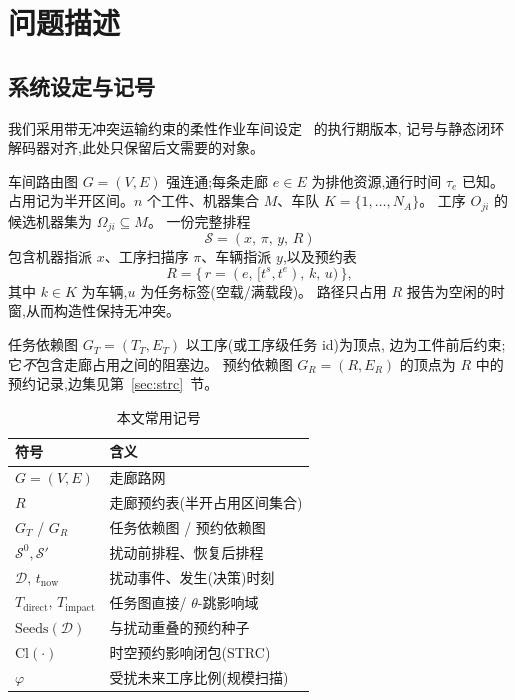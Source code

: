 \documentclass[manuscript,screen,review]{acmart}
\providecommand{\STRC}{\textsc{STRC}}
\begin{document}
\section{问题描述}
\label{sec:problem}

\subsection{系统设定与记号}
\label{sec:system_brief}

我们采用带无冲突运输约束的柔性作业车间设定~\cite{vanos2026exact} 的执行期版本,
记号与静态闭环解码器对齐,此处只保留后文需要的对象。

车间路由图 \(G=(V,E)\) 强连通;每条走廊 \(e\in E\) 为排他资源,通行时间 \(\tau_e\) 已知。
占用记为半开区间。\(n\) 个工件、机器集合 \(M\)、车队 \(K=\{1,\ldots,N_A\}\)。
工序 \(O_{ji}\) 的候选机器集为 \(\Omega_{ji}\subseteq M\)。
一份完整排程
\[
\mathcal{S}=(x,\,\pi,\,y,\,R)
\]
包含机器指派 \(x\)、工序扫描序 \(\pi\)、车辆指派 \(y\),以及预约表
\[
R=\bigl\{\,r=(e,\,[t^s,t^e),\,k,\,u)\,\bigr\},
\]
其中 \(k\in K\) 为车辆,\(u\) 为任务标签(空载/满载段)。
路径只占用 \(R\) 报告为空闲的时窗,从而构造性保持无冲突。

任务依赖图 \(G_T=(T_T,E_T)\) 以工序(或工序级任务 id)为顶点,
边为工件前后约束;它\emph{不}包含走廊占用之间的阻塞边。
预约依赖图 \(G_R=(R,E_R)\) 的顶点为 \(R\) 中的预约记录,边集见第~\ref{sec:strc}~节。

\begin{table}[t]
\centering
\caption{本文常用记号}
\label{tab:notation}
\small
\begin{tabular}{@{}ll@{}}
\toprule
\textbf{符号} & \textbf{含义} \\
\midrule
\(G=(V,E)\) & 走廊路网 \\
\(R\) & 走廊预约表(半开占用区间集合) \\
\(G_T\) / \(G_R\) & 任务依赖图 / 预约依赖图 \\
\(\mathcal{S}^0,\mathcal{S}'\) & 扰动前排程、恢复后排程 \\
\(\mathcal{D},\,t_{\mathrm{now}}\) & 扰动事件、发生(决策)时刻 \\
\(T_{\mathrm{direct}},\,T_{\mathrm{impact}}\) & 任务图直接/ \(\theta\)-跳影响域 \\
\(\mathrm{Seeds}(\mathcal{D})\) & 与扰动重叠的预约种子 \\
\(\mathrm{Cl}(\cdot)\) & 时空预约影响闭包(\STRC) \\
\(\varphi\) & 受扰未来工序比例(规模扫描) \\
\bottomrule
\end{tabular}
\end{table}
\end{document}
